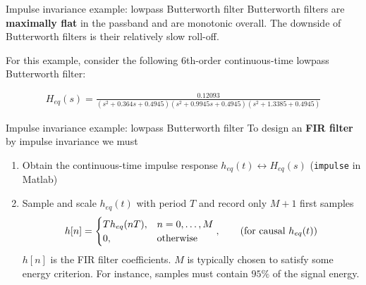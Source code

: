 \documentclass[10pt, aspectratio=169]{beamer}
\begin{document}
\begin{frame}{Impulse invariance example: lowpass Butterworth filter}
Butterworth filters are \textbf{maximally flat} in the passband and are monotonic overall. The downside of Butterworth filters is their relatively slow roll-off.
\vspace{0.25cm}

For this example, consider the following 6th-order continuous-time lowpass Butterworth filter:

\begin{align*}
H_{eq}(s) = \frac{0.12093}{(s^2 + 0.364s + 0.4945)(s^2 + 0.9945s + 0.4945)(s^2 + 1.3385 + 0.4945)}
\end{align*}

\end{frame}

%
\begin{frame}{Impulse invariance example: lowpass Butterworth filter}
To design an \textbf{FIR filter} by impulse invariance we must
\begin{enumerate}
	\item Obtain the continuous-time impulse response $h_{eq}(t) \longleftrightarrow H_{eq}(s)$ (\texttt{impulse} in Matlab)
	\item Sample and scale $h_{eq}(t)$ with period $T$ and record only $M+1$ first samples 
	\begin{equation*}
		h[n] = \begin{cases}
		Th_{eq}(nT), & n = 0, \ldots, M \\
		0, & \text{otherwise}
		\end{cases}, \tag{for causal $h_{eq}(t)$}
	\end{equation*}
	$h[n]$ is the FIR filter coefficients. $M$ is typically chosen to satisfy some energy criterion. For instance, samples must contain $95\%$ of the signal energy.
\end{enumerate} 
\begin{center}
	\resizebox{0.5\linewidth}{!}{}
\end{center}

\end{frame}
\end{document}

